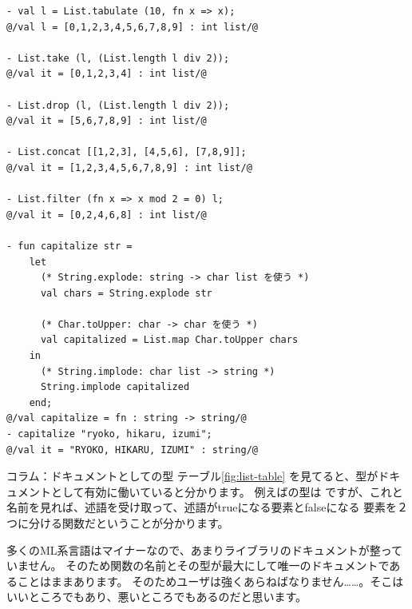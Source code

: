 \documentclass[11pt,a4paper]{jarticle}
\begin{document}
\begin{lstlisting}[caption=Listモジュール,label=code:list-mod]
- val l = List.tabulate (10, fn x => x);
@/val l = [0,1,2,3,4,5,6,7,8,9] : int list/@

- List.take (l, (List.length l div 2));
@/val it = [0,1,2,3,4] : int list/@

- List.drop (l, (List.length l div 2));
@/val it = [5,6,7,8,9] : int list/@

- List.concat [[1,2,3], [4,5,6], [7,8,9]];
@/val it = [1,2,3,4,5,6,7,8,9] : int list/@

- List.filter (fn x => x mod 2 = 0) l;
@/val it = [0,2,4,6,8] : int list/@

- fun capitalize str =
    let
      (* String.explode: string -> char list を使う *)
      val chars = String.explode str

      (* Char.toUpper: char -> char を使う *)
      val capitalized = List.map Char.toUpper chars
    in
      (* String.implode: char list -> string *)
      String.implode capitalized
    end;
@/val capitalize = fn : string -> string/@
- capitalize "ryoko, hikaru, izumi";
@/val it = "RYOKO, HIKARU, IZUMI" : string/@
\end{lstlisting}

\begin{itembox}[l]{コラム：ドキュメントとしての型}
テーブル\ref{fig:list-table} を見てると、型がドキュメントとして有効に働いていると分かります。
例えばの型は
ですが、これと名前を見れば、述語を受け取って、述語がtrueになる要素とfalseになる
要素を２つに分ける関数だということが分かります。

多くのML系言語はマイナーなので、あまりライブラリのドキュメントが整っていません。
そのため関数の名前とその型が最大にして唯一のドキュメントであることはままあります。
そのためユーザは強くあらねばなりません……。そこはいいところでもあり、悪いところでもあるのだと思います。
\end{itembox}
\end{document}
